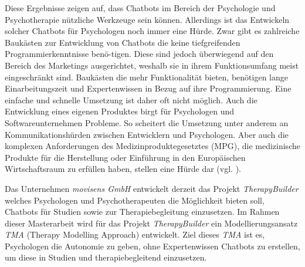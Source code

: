 
Diese Ergebnisse zeigen auf, dass Chatbots im Bereich der Psychologie und Psychotherapie nützliche Werkzeuge sein können. Allerdings ist das Entwickeln solcher Chatbots für Psychologen noch immer eine Hürde. Zwar gibt es zahlreiche Baukästen zur Entwicklung von Chatbots die keine tiefgreifenden Programmierkenntnisse benö-tigen. Diese sind jedoch überwiegend auf den Bereich des Marketings ausgerichtet, weshalb sie in ihrem Funktionsumfang meist eingeschränkt sind. Baukästen die mehr Funktionalität bieten, benötigen lange Einarbeitungszeit und Expertenwissen in Bezug auf ihre Programmierung. Eine einfache und schnelle Umsetzung ist daher oft nicht möglich. Auch die Entwicklung eines eigenen Produktes birgt für Psychologen und Softwareunternehmen Probleme. So scheitert die Umsetzung unter anderem an Kommunikationshürden zwischen Entwicklern und Psychologen. Aber auch die komplexen Anforderungen des Medizinproduktegesetztes (MPG), die medizinische Produkte für die Herstellung oder Einführung in den Europäischen Wirtschaftsraum zu erfüllen haben, stellen eine Hürde dar (vgl. \cite{MPGnicht8:online}).  

Das Unternehmen \emph{movisens GmbH} entwickelt derzeit das Projekt \emph{TherapyBuilder} welches Psychologen und Psychotherapeuten die Möglichkeit bieten soll, Chatbots  für Studien sowie zur Therapiebegleitung einzusetzen. Im Rahmen dieser Masterarbeit wird für das Projekt \emph{TherapyBuilder} ein Modellierungsansatz \emph{TMA} (Therapy Modelling Approach) entwickelt. Ziel dieses \emph{TMA} ist es, Psychologen die Autonomie zu geben, ohne Expertenwissen Chatbots zu erstellen, um diese in Studien und therapiebegleitend einzusetzen.




 
